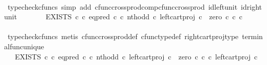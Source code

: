 \begin{isabellebody}
\ \ \ \ \isamarkupfalse%
\ {\isacharparenleft}{\kern0pt}typecheck{\isacharunderscore}{\kern0pt}cfuncs{\isacharcomma}{\kern0pt}\ simp\ add{\isacharcolon}{\kern0pt}\ cfunc{\isacharunderscore}{\kern0pt}cross{\isacharunderscore}{\kern0pt}prod{\isacharunderscore}{\kern0pt}comp{\isacharunderscore}{\kern0pt}cfunc{\isacharunderscore}{\kern0pt}cross{\isacharunderscore}{\kern0pt}prod\ id{\isacharunderscore}{\kern0pt}left{\isacharunderscore}{\kern0pt}unit{}\ id{\isacharunderscore}{\kern0pt}right{\isacharunderscore}{\kern0pt}unit{}{\isacharparenright}{\kern0pt}\isanewline
\ \ \isamarkupfalse%
\ \isamarkupfalse%
\ {\isachardoublequoteopen}{\isachardot}{\kern0pt}{\isachardot}{\kern0pt}{\isachardot}{\kern0pt}\ {\isacharequal}{\kern0pt}\ EXISTS\ {\isasymnat}\isactrlsub c\ {\isasymcirc}\isactrlsub c\ {\isacharparenleft}{\kern0pt}eq{\isacharunderscore}{\kern0pt}pred\ {\isasymnat}\isactrlsub c\ {\isasymcirc}\isactrlsub c\ {\isasymlangle}nth{\isacharunderscore}{\kern0pt}odd\ {\isasymcirc}\isactrlsub c\ left{\isacharunderscore}{\kern0pt}cart{\isacharunderscore}{\kern0pt}proj\ {\isasymnat}\isactrlsub c\ {\isasymone}{\isacharcomma}{\kern0pt}\ zero\ {\isasymcirc}\isactrlsub c\ {\isasymbeta}\isactrlbsub {\isasymnat}\isactrlsub c\ {\isasymtimes}\isactrlsub c\ {\isasymone}\isactrlesub {\isasymrangle}\ {\isacharparenright}{\kern0pt}\isactrlsup {\isasymsharp}{\isachardoublequoteclose}\isanewline
\ \ \ \ \isamarkupfalse%
\ {\isacharparenleft}{\kern0pt}typecheck{\isacharunderscore}{\kern0pt}cfuncs{\isacharcomma}{\kern0pt}\ metis\ cfunc{\isacharunderscore}{\kern0pt}cross{\isacharunderscore}{\kern0pt}prod{\isacharunderscore}{\kern0pt}def\ cfunc{\isacharunderscore}{\kern0pt}type{\isacharunderscore}{\kern0pt}def\ right{\isacharunderscore}{\kern0pt}cart{\isacharunderscore}{\kern0pt}proj{\isacharunderscore}{\kern0pt}type\ terminal{\isacharunderscore}{\kern0pt}func{\isacharunderscore}{\kern0pt}unique{\isacharparenright}{\kern0pt}\isanewline
\ \ \isamarkupfalse%
\ \isamarkupfalse%
\ {\isachardoublequoteopen}{\isachardot}{\kern0pt}{\isachardot}{\kern0pt}{\isachardot}{\kern0pt}\ {\isacharequal}{\kern0pt}\ EXISTS\ {\isasymnat}\isactrlsub c\ {\isasymcirc}\isactrlsub c\ {\isacharparenleft}{\kern0pt}eq{\isacharunderscore}{\kern0pt}pred\ {\isasymnat}\isactrlsub c\ {\isasymcirc}\isactrlsub c\ {\isasymlangle}nth{\isacharunderscore}{\kern0pt}odd\ {\isasymcirc}\isactrlsub c\ left{\isacharunderscore}{\kern0pt}cart{\isacharunderscore}{\kern0pt}proj\ {\isasymnat}\isactrlsub c\ {\isasymone}{\isacharcomma}{\kern0pt}\ {\isacharparenleft}{\kern0pt}zero\ {\isasymcirc}\isactrlsub c\ {\isasymbeta}\isactrlbsub {\isasymnat}\isactrlsub c\isactrlesub {\isacharparenright}{\kern0pt}\ {\isasymcirc}\isactrlsub c\ left{\isacharunderscore}{\kern0pt}cart{\isacharunderscore}{\kern0pt}proj\ {\isasymnat}\isactrlsub c\ {\isasymone}{\isasymrangle}\ {\isacharparenright}{\kern0pt}\isactrlsup {\isasymsharp}{\isachardoublequoteclose}\isanewline

\end{isabellebody}

